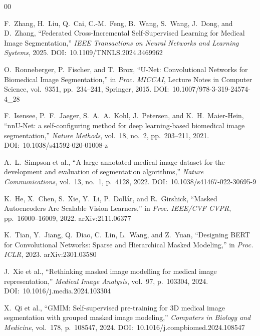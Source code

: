 \documentclass[conference]{IEEEtran}
\begin{document}
\begin{thebibliography}{00}

F.~Zhang, H.~Liu, Q.~Cai, C.-M.~Feng, B.~Wang, S.~Wang, J.~Dong, and D.~Zhang,
``Federated Cross-Incremental Self-Supervised Learning for Medical Image Segmentation,''
\textit{IEEE Transactions on Neural Networks and Learning Systems},
2025. DOI:~10.1109/TNNLS.2024.3469962

O.~Ronneberger, P.~Fischer, and T.~Brox,
``U-Net: Convolutional Networks for Biomedical Image Segmentation,''
in \textit{Proc. MICCAI}, Lecture Notes in Computer Science, vol.~9351, pp.~234--241,
Springer, 2015. DOI:~10.1007/978-3-319-24574-4\_28

F.~Isensee, P.~F.~Jaeger, S.~A.~A.~Kohl, J.~Petersen, and K.~H.~Maier-Hein,
``nnU-Net: a self-configuring method for deep learning-based biomedical image segmentation,''
\textit{Nature Methods}, vol.~18, no.~2, pp.~203--211, 2021.
DOI:~10.1038/s41592-020-01008-z

A.~L.~Simpson et al.,
``A large annotated medical image dataset for the development and evaluation of segmentation algorithms,''
\textit{Nature Communications}, vol.~13, no.~1, p.~4128, 2022.
DOI:~10.1038/s41467-022-30695-9

K.~He, X.~Chen, S.~Xie, Y.~Li, P.~Dollár, and R.~Girshick,
``Masked Autoencoders Are Scalable Vision Learners,''
in \textit{Proc. IEEE/CVF CVPR}, pp.~16000--16009, 2022.
arXiv:2111.06377

K.~Tian, Y.~Jiang, Q.~Diao, C.~Lin, L.~Wang, and Z.~Yuan,
``Designing BERT for Convolutional Networks: Sparse and Hierarchical Masked Modeling,''
in \textit{Proc. ICLR}, 2023.
arXiv:2301.03580

J.~Xie et al.,
``Rethinking masked image modelling for medical image representation,''
\textit{Medical Image Analysis}, vol.~97, p.~103304, 2024.
DOI:~10.1016/j.media.2024.103304

X.~Qi et al.,
``GMIM: Self-supervised pre-training for 3D medical image segmentation with grouped masked image modeling,''
\textit{Computers in Biology and Medicine}, vol.~178, p.~108547, 2024.
DOI:~10.1016/j.compbiomed.2024.108547


\end{thebibliography}
\end{document}
